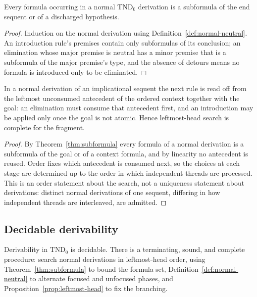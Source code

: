 \begin{theorem}\label{thm:subformula}
Every formula occurring in a normal $\mathrm{TND}_0$ derivation is a subformula of the end
sequent or of a discharged hypothesis.
\end{theorem}

\begin{proof}
Induction on the normal derivation using Definition~\ref{def:normal-neutral}.  An
introduction rule's premises contain only subformulas of its conclusion; an elimination
whose major premise is neutral has a minor premise that is a subformula of the major
premise's type, and the absence of detours means no formula is introduced only to be
eliminated.
\end{proof}

\begin{proposition}\label{prop:leftmost-head}
In a normal derivation of an implicational sequent the next rule is read off from the
leftmost unconsumed antecedent of the ordered context together with the goal: an elimination
must consume that antecedent first, and an introduction may be applied only once the goal is
not atomic.  Hence leftmost-head search is complete for the fragment.
\end{proposition}

\begin{proof}
By Theorem~\ref{thm:subformula} every formula of a normal derivation is a subformula of the
goal or of a context formula, and by linearity no antecedent is reused.  Order fixes which
antecedent is consumed next, so the choices at each stage are determined up to the order in
which independent threads are processed.  This is an order statement about the search, not a
uniqueness statement about derivations: distinct normal derivations of one sequent, differing
in how independent threads are interleaved, are admitted.
\end{proof}

\subsection{Decidable derivability}

\begin{theorem}\label{thm:decidability}
Derivability in $\mathrm{TND}_0$ is decidable.  There is a terminating, sound, and complete
procedure: search normal derivations in leftmost-head order, using
Theorem~\ref{thm:subformula} to bound the formula set, Definition~\ref{def:normal-neutral}
to alternate focused and unfocused phases, and Proposition~\ref{prop:leftmost-head} to fix
the branching.
\end{theorem}

